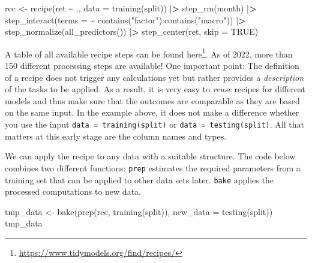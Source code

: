 \documentclass[
]{krantz}
\newenvironment{Shaded}{\begin{snugshade}}{\end{snugshade}}
\newcommand{\AttributeTok}[1]{\textcolor[rgb]{0.61,0.61,0.61}{#1}}
\newcommand{\ConstantTok}[1]{\textcolor[rgb]{0,0,0}{#1}}
\newcommand{\ErrorTok}[1]{\textcolor[rgb]{0.14,0.14,0.14}{\textbf{#1}}}
\newcommand{\FunctionTok}[1]{\textcolor[rgb]{0,0,0}{#1}}
\newcommand{\NormalTok}[1]{#1}
\newcommand{\OtherTok}[1]{\textcolor[rgb]{0.37,0.37,0.37}{#1}}
\newcommand{\SpecialCharTok}[1]{\textcolor[rgb]{0,0,0}{#1}}
\newcommand{\StringTok}[1]{\textcolor[rgb]{0.5,0.5,0.5}{#1}}
\renewcommand{\href}[2]{#2\footnote{\url{#1}}}
\begin{document}
\begin{Shaded}
\begin{Highlighting}[]
\NormalTok{rec }\OtherTok{\textless{}{-}} \FunctionTok{recipe}\NormalTok{(ret }\SpecialCharTok{\textasciitilde{}}\NormalTok{ ., }\AttributeTok{data =} \FunctionTok{training}\NormalTok{(split)) }\SpecialCharTok{|}\ErrorTok{\textgreater{}}
  \FunctionTok{step\_rm}\NormalTok{(month) }\SpecialCharTok{|}\ErrorTok{\textgreater{}}
  \FunctionTok{step\_interact}\NormalTok{(}\AttributeTok{terms =} \SpecialCharTok{\textasciitilde{}} \FunctionTok{contains}\NormalTok{(}\StringTok{"factor"}\NormalTok{)}\SpecialCharTok{:}\FunctionTok{contains}\NormalTok{(}\StringTok{"macro"}\NormalTok{)) }\SpecialCharTok{|}\ErrorTok{\textgreater{}}
  \FunctionTok{step\_normalize}\NormalTok{(}\FunctionTok{all\_predictors}\NormalTok{()) }\SpecialCharTok{|}\ErrorTok{\textgreater{}}
  \FunctionTok{step\_center}\NormalTok{(ret, }\AttributeTok{skip =} \ConstantTok{TRUE}\NormalTok{)}
\end{Highlighting}
\end{Shaded}

A table of all available recipe steps can be found \href{https://www.tidymodels.org/find/recipes/}{here}. As of 2022, more than 150 different processing steps are available! One important point: The definition of a recipe does not trigger any calculations yet but rather provides a \emph{description} of the tasks to be applied. As a result, it is very easy to \emph{reuse} recipes for different models and thus make sure that the outcomes are comparable as they are based on the same input.
In the example above, it does not make a difference whether you use the input \texttt{data\ =\ training(split)} or \texttt{data\ =\ testing(split)}.
All that matters at this early stage are the column names and types.

We can apply the recipe to any data with a suitable structure. The code below combines two different functions: \texttt{prep} estimates the required parameters from a training set that can be applied to other data sets later. \texttt{bake} applies the processed computations to new data.

\begin{Shaded}
\begin{Highlighting}[]
\NormalTok{tmp\_data }\OtherTok{\textless{}{-}} \FunctionTok{bake}\NormalTok{(}\FunctionTok{prep}\NormalTok{(rec, }\FunctionTok{training}\NormalTok{(split)), }\AttributeTok{new\_data =} \FunctionTok{testing}\NormalTok{(split))}
\NormalTok{tmp\_data}
\end{Highlighting}
\end{Shaded}
\end{document}

